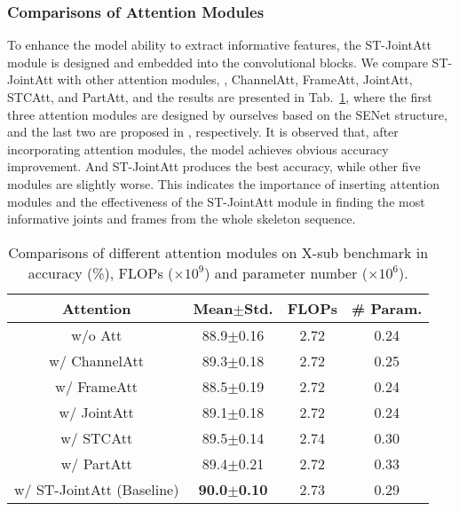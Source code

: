 \documentclass[10pt,journal,compsoc]{IEEEtran}
\begin{document}
\subsubsection{Comparisons of Attention Modules}
\label{sssec:compare_attention}

To enhance the model ability to extract informative features, the ST-JointAtt module is designed and embedded into the convolutional blocks. We compare ST-JointAtt with other attention modules, \ie, ChannelAtt, FrameAtt, JointAtt, STCAtt, and PartAtt, and the results are presented in Tab.~\ref{tab:attention}, where the first three attention modules are designed by ourselves based on the SENet \cite{hu2018squeeze} structure, and the last two are proposed in \cite{shi2020skeleton,song2020stronger}, respectively. It is observed that, after incorporating attention modules, the model achieves obvious accuracy improvement. And ST-JointAtt produces the best accuracy, while other five modules are slightly worse. This indicates the importance of inserting attention modules and the effectiveness of the ST-JointAtt module in finding the most informative joints and frames from the whole skeleton sequence.

\begin{table}[t]
  \caption{Comparisons of different attention modules on X-sub benchmark in accuracy (\%), FLOPs ($\times10^9$) and parameter number ($\times10^6$).}
  \label{tab:attention}
  \vspace{-0.4cm}
  \centering
  \setlength{\tabcolsep}{4pt}
  \renewcommand{\arraystretch}{1.2}
  \begin{tabular}{c|ccc}
  \toprule
  Attention & Mean$\pm$Std. & FLOPs & \# Param. \\
  \midrule
  w/o Att & 88.9$\pm$0.16 & 2.72 & 0.24 \\
  w/ ChannelAtt & 89.3$\pm$0.18 & 2.72 & 0.25 \\
  w/ FrameAtt & 88.5$\pm$0.19 & 2.72 & 0.24 \\
  w/ JointAtt & 89.1$\pm$0.18 & 2.72 & 0.24 \\
  w/ STCAtt \cite{shi2020skeleton} & 89.5$\pm$0.14 & 2.74 & 0.30 \\
  w/ PartAtt \cite{song2020stronger} & 89.4$\pm$0.21 & 2.72 & 0.33 \\
  w/ ST-JointAtt (Baseline) & {\bf 90.0$\pm$0.10} & 2.73 & 0.29 \\
  \bottomrule
  \end{tabular}
\end{table}
\end{document}
